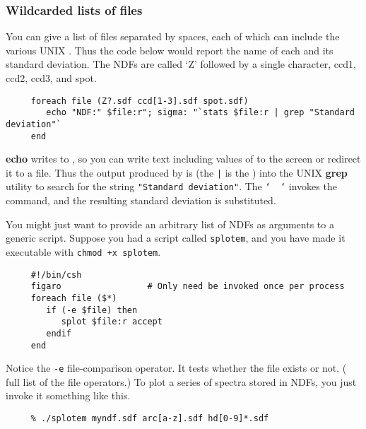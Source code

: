 \subsubsection{Wildcarded lists of files
\label{sc4_se_wildcard_lists}}

You can give a list of files separated by spaces, each of which can
include the various UNIX .  Thus
the code below would report the name of each  and
its standard deviation. The NDFs are called `Z' followed by a single
character, ccd1, ccd2, ccd3, and spot.

\small
\begin{verbatim}
     foreach file (Z?.sdf ccd[1-3].sdf spot.sdf)
        echo "NDF:" $file:r"; sigma: "`stats $file:r | grep "Standard deviation"`
     end
\end{verbatim}
\normalsize

{\bf echo} writes to ,
so you can write text including values of  to the screen or redirect it to a file.
Thus the output produced by  is
 (the {\tt |} is the ) into the UNIX {\bf grep} utility to search for
the string {\tt "Standard deviation"}.  The {\tt `~~`} invokes the
command, and the resulting standard deviation is substituted.
\medskip

You might just want to provide an arbitrary list of NDFs as arguments to
a generic script.  Suppose you had a script called {\tt splotem}, and
you have made it executable with \mbox{\tt chmod +x splotem}.

\small
\begin{verbatim}
     #!/bin/csh
     figaro                 # Only need be invoked once per process
     foreach file ($*) 
        if (-e $file) then
           splot $file:r accept
        endif
     end
\end{verbatim}
\normalsize

Notice the {\tt -e} file-comparison operator.  It tests whether the
file exists or not.  ( full list of
the file operators.) To plot a series of spectra stored in NDFs, you
just invoke it something like this.

\small
\begin{verbatim}
     % ./splotem myndf.sdf arc[a-z].sdf hd[0-9]*.sdf
\end{verbatim}
\normalsize

